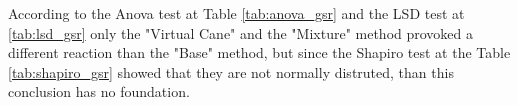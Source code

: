 According to the Anova test at Table \ref{tab:anova_gsr} and the LSD test at \ref{tab:lsd_gsr} only the "Virtual Cane" and the "Mixture" method provoked a different reaction than the "Base" method, but since the Shapiro test at the Table \ref{tab:shapiro_gsr} showed that they are not normally distruted, than this conclusion has no foundation.

\FloatBarrier

